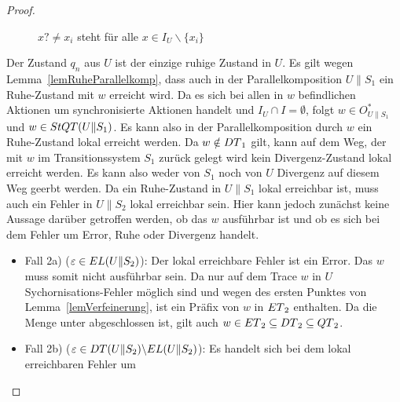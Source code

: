 \begin{proof}
\begin{itemize}
\begin{figure} [h!tbp]
\begin{center}
        \caption{$x?\neq x_i$ steht für alle $x\in I_U\backslash\{x_i\}$}
\label{UohneEmitIundO}
      \end{center}
      \end{figure}
      Der Zustand $q_n$ aus $U$ ist der einzige ruhige Zustand in $U$.
      Es gilt wegen Lemma~\ref{lemRuheParallelkomp}, dass auch in der
      Parallelkomposition $U\|S_1$ ein Ruhe-Zustand mit $w$ erreicht wird. Da
      es sich bei allen in $w$ befindlichen Aktionen um synchronisierte
      Aktionen handelt und $I_U\cap I=\emptyset$, folgt $w\in O_{U\|S_1}^*$ und
      $w\in StQT{}(U\|S_1)$. Es kann also in der Parallelkomposition durch $w$
      ein Ruhe-Zustand lokal erreicht werden. Da $w\notin DT{}_1$ gilt, kann
      auf dem Weg, der mit $w$ im Transitionssystem $S_1$ zurück gelegt wird
      kein Divergenz-Zustand lokal erreicht werden. Es kann also weder von
      $S_1$ noch von $U$ Divergenz auf diesem Weg geerbt werden. Da ein
      Ruhe-Zustand in $U\|S_1$ lokal erreichbar ist, muss auch ein Fehler in
      $U\|S_2$ lokal erreichbar sein. Hier kann jedoch zunächst keine Aussage
      darüber getroffen werden, ob das $w$ ausführbar ist und ob es sich bei
      dem Fehler um Error, Ruhe oder Divergenz handelt.
      \begin{itemize}
        \item Fall 2a) ($\varepsilon\in EL{}(U\|S_2)$): Der lokal erreichbare
          Fehler ist ein Error. Das $w$ muss somit nicht ausführbar sein. Da
          nur auf dem Trace $w$ in $U$ Sychornisa\-tions-Fehler möglich sind und
          wegen des ersten Punktes von Lemma~\ref{lemVerfeinerung}, ist ein
          Präfix von $w$ in $ET{}_2$ enthalten. Da die Menge \ET{} unter
          \cont{} abgeschlossen ist, gilt auch $w\in ET{}_2\subseteq DT{}_2
          \subseteq QT{}_2$.
        \item Fall 2b) ($\varepsilon\in DT{}(U\|S_2)\backslash
          EL{}(U\|S_2)$): Es handelt sich bei dem lokal erreichbaren Fehler um

\end{itemize}
\end{itemize}
\end{proof}
